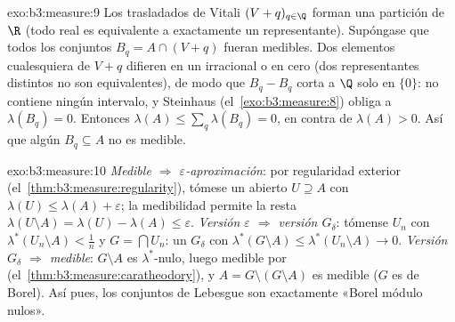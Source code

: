 \begin{solution}{exo:b3:measure:9}
Los trasladados de Vitali $(V + q)_{q\in\Q}$ forman una partición de
$\R$ (todo real es equivalente a exactamente un representante).
Supóngase que todos los conjuntos $B_q = A \cap (V + q)$ fueran
medibles. Dos elementos cualesquiera de $V + q$ difieren en un
irracional o en cero (dos representantes distintos no son equivalentes),
de modo que $B_q - B_q$ corta a $\Q$ solo en $\{0\}$: no contiene ningún
intervalo, y Steinhaus (el~\cref{exo:b3:measure:8}) obliga a
$\lambda(B_q) = 0$. Entonces $\lambda(A) \leq \sum_{q}\lambda(B_q) = 0$,
en contra de $\lambda(A) > 0$. Así que algún $B_q \subseteq A$ no es
medible.
\end{solution}

\begin{solution}{exo:b3:measure:10}
\emph{Medible $\Rightarrow$ $\varepsilon$-aproximación}: por regularidad
exterior (el~\cref{thm:b3:measure:regularity}), tómese un abierto
$U \supseteq A$ con $\lambda(U) \leq \lambda(A) +
\varepsilon$; la medibilidad permite la resta
$\lambda(U\setminus A) = \lambda(U) - \lambda(A) \leq
\varepsilon$. \emph{Versión $\varepsilon$ $\Rightarrow$ versión
$G_\delta$}: tómense $U_n$ con $\lambda^*(U_n\setminus
A) < \frac1n$ y $G = \bigcap U_n$: un $G_\delta$ con
$\lambda^*(G\setminus A) \leq \lambda^*(U_n\setminus A) \to 0$.
\emph{Versión $G_\delta$ $\Rightarrow$ medible}: $G\setminus
A$ es $\lambda^*$-nulo, luego medible por
(el~\cref{thm:b3:measure:caratheodory}), y $A = G \setminus
(G\setminus A)$ es medible ($G$ es de Borel). Así pues, los conjuntos de
Lebesgue son exactamente «Borel módulo nulos».
\end{solution}

